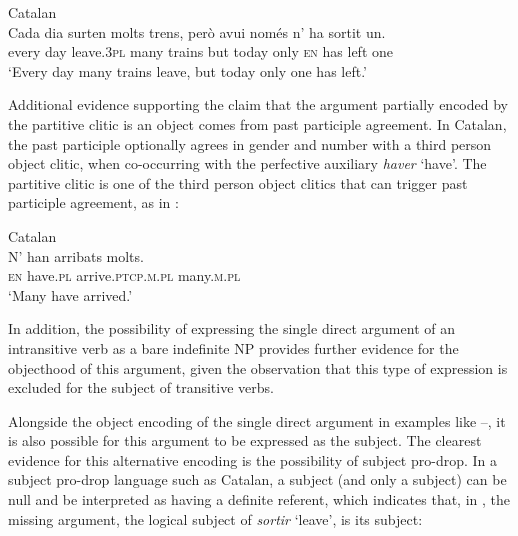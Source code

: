 \documentclass[output=paper,hidelinks]{langscibook}
\begin{document}
\ea\label{ex:Romance:39} Catalan    \citep[48]{AlsinaYang2018}\\
\gll
Cada dia surten molts trens, però avui només n' ha sortit       un.\\
every day leave.\textsc{3pl} many trains but today only \textsc{en} has left one\\
\glt   `Every day many trains leave, but today only one has left.' 
\z

Additional evidence supporting the claim that the argument partially encoded by the partitive clitic is an object comes from past participle agreement. In Catalan, the past participle optionally agrees in gender and number with a third person object clitic, when co-occurring with the perfective auxiliary \textit{haver} `have'. The partitive clitic is one of the third person object clitics that can trigger past participle agreement, as in :

\ea\label{ex:Romance:40}Catalan \citep[160]{Fabra1912}\\
\gll
N' han arribats molts.\\
\textsc{en} have.\textsc{pl} arrive.\textsc{ptcp.m.pl} many.\textsc{m.pl}\\
\glt   `Many have arrived.'  
\z

In addition, the possibility of expressing the single direct argument of an intransitive verb as a bare indefinite NP provides further evidence for the objecthood of this argument, given the observation that this type of expression is excluded for the subject of transitive verbs.

\newpage
Alongside the object encoding of the single direct argument in examples like --, it is also possible for this argument to be expressed as the subject. The clearest evidence for this alternative encoding is the possibility of subject pro-drop. In a subject pro-drop language such as Catalan, a subject (and only a subject) can be null and be interpreted as having a definite referent, which indicates that, in , the missing argument, the logical subject of \textit{sortir} `leave', is its subject:
\end{document}
